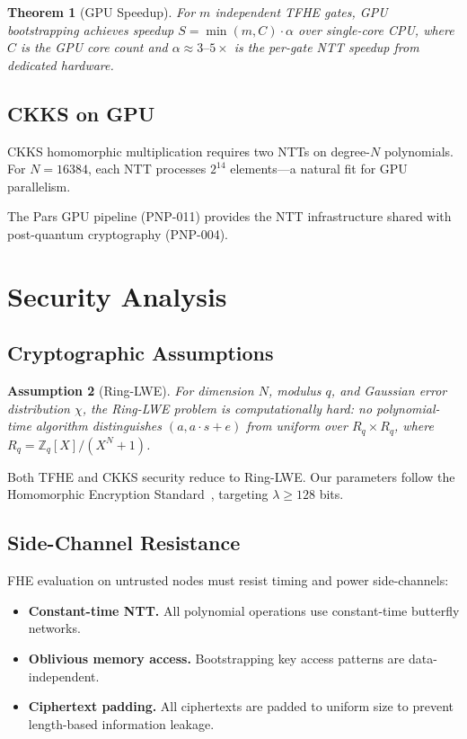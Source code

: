 \documentclass[11pt,a4paper]{article}
\newtheorem{theorem}{Theorem}[section]
\newtheorem{assumption}[theorem]{Assumption}
\begin{document}
\begin{theorem}[GPU Speedup]
    For $m$ independent TFHE gates, GPU bootstrapping achieves speedup
    $S = \min(m, C) \cdot \alpha$ over single-core CPU, where $C$ is
    the GPU core count and $\alpha \approx 3\text{--}5\times$ is the
    per-gate NTT speedup from dedicated hardware.
\end{theorem}

\subsection{CKKS on GPU}

CKKS homomorphic multiplication requires two NTTs on degree-$N$
polynomials.  For $N = 16384$, each NTT processes $2^{14}$ elements---a
natural fit for GPU parallelism.

The Pars GPU pipeline (PNP-011) provides the NTT infrastructure shared
with post-quantum cryptography (PNP-004).

\section{Security Analysis}
\label{sec:security}

\subsection{Cryptographic Assumptions}

\begin{assumption}[Ring-LWE]
    For dimension $N$, modulus $q$, and Gaussian error distribution
    $\chi$, the Ring-LWE problem is computationally hard: no
    polynomial-time algorithm distinguishes $(a, a \cdot s + e)$ from
    uniform over $R_q \times R_q$, where $R_q = \mathbb{Z}_q[X]/(X^N+1)$.
\end{assumption}

Both TFHE and CKKS security reduce to Ring-LWE.  Our parameters follow
the Homomorphic Encryption Standard~\cite{hes2018}, targeting $\lambda
\geq 128$ bits.

\subsection{Side-Channel Resistance}

FHE evaluation on untrusted nodes must resist timing and power
side-channels:

\begin{itemize}
    \item \textbf{Constant-time NTT.}  All polynomial operations use
    constant-time butterfly networks.
    \item \textbf{Oblivious memory access.}  Bootstrapping key access
    patterns are data-independent.
    \item \textbf{Ciphertext padding.}  All ciphertexts are padded to
    uniform size to prevent length-based information leakage.
\end{itemize}
\end{document}
